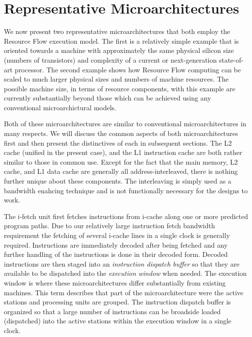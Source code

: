 \documentclass{book}
\begin{document}
\section{Representative Microarchitectures}
%
We now present two representative microarchitectures that both
employ the Resource Flow execution model.
The first is a relatively simple example that is oriented
towards a machine with approximately the same physical silicon size
(numbers of transistors) and complexity of a current or next-generation
state-of-art
processor.
The second example shows how Resource Flow computing can be
scaled to much larger physical sizes and numbers of machine
resources.  The possible machine size, in terms of resource components,
with this example are currently
substantially beyond those which can be achieved using any
conventional microarchictural models.

Both of these microarchitectures are similar to conventional
microarchitectures in many respects.  We will discuss
the common aspects of both microarchitectures first and
then present the distinctives of each in subsequent sections.
The L2 cache (unified in the present case), and the L1 instruction 
cache are both rather similar to those in common use.
Except for the fact that the main memory, L2 cache, and L1 data
cache are generally all address-interleaved, there is nothing further
unique about these components.   The interleaving is simply
used as a bandwidth enahcing technique and is not functionally
necessary for the designs to work.

The i-fetch unit first fetches instructions from i-cache
along one or more predicted program paths.
Due to our relatively large instruction fetch bandwidth
requirement the fetching
of several i-cache lines in a single clock is generally required.
Instructions are immediately
decoded after being fetched and any further
handling of the instructions is done in their decoded
form.
Decoded instructions are then staged
into an \textit{instruction dispatch buffer}
so that they are available to be dispatched
into the \textit{execution window} when needed.  
The execution window is where these
microarchitectures differ substantially from existing machines.
This term describes that part of the microarchitecture were
the active stations and processing units are grouped.
The instruction dispatch buffer is organized so that
a large number of instructions can be broadside loaded (dispatched) into the
active stations within the execution window in a single clock.
\end{document}
